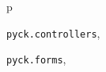 \documentclass[letterpaper,10pt,english]{sphinxmanual}
\begin{document}
\renewcommand{\indexname}{Python Module Index}
\begin{theindex}
\def\bigletter#1{{\Large\sffamily#1}\nopagebreak\vspace{1mm}}
\bigletter{p}
\item {\texttt{pyck.controllers}}, \pageref{pyck-controllers:module-pyck.controllers}
\item {\texttt{pyck.forms}}, \pageref{pyck-forms:module-pyck.forms}
\end{theindex}

\renewcommand{\indexname}{Index}
\printindex
\end{document}
